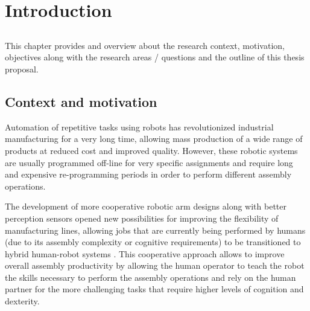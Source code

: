 \chapter{Introduction}\label{chap:introduction}



\section*{}

This chapter provides and overview about the research context, motivation, objectives along with the research areas / questions and the outline of this thesis proposal.



\section{Context and motivation}

Automation of repetitive tasks using robots has revolutionized industrial manufacturing for a very long time, allowing mass production of a wide range of products at reduced cost and improved quality. However, these robotic systems are usually programmed off-line for very specific assignments and require long and expensive re-programming periods in order to perform different assembly operations.

The development of more cooperative robotic arm designs along with better perception sensors opened new possibilities for improving the flexibility of manufacturing lines, allowing jobs that are currently being performed by humans (due to its assembly complexity or cognitive requirements) to be transitioned to hybrid human-robot systems \cite{Surdilovic2010}. This cooperative approach allows to improve overall assembly productivity by allowing the human operator to teach the robot the skills necessary to perform the assembly operations and rely on the human partner for the more challenging tasks that require higher levels of cognition and dexterity.

